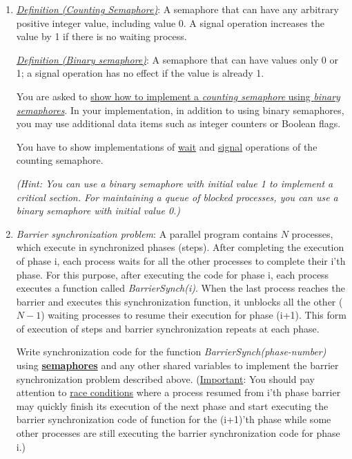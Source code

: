 \documentclass[11pt]{article}
\newcommand{\n}{\vspace{0.3cm}}
\begin{document}
\begin{enumerate}
  \item \textit{\ul{Definition (Counting Semaphore)}}: A semaphore that can have any arbitrary positive integer value, including value 0.  A signal operation increases the value by 1 if there is no waiting process.

    \textit{\ul{Definition (Binary semaphore)}}: A semaphore that can have values only 0 or 1; a signal operation has no effect if the value is already 1. \n

    You are asked to \ul{show how to implement a \textit{counting semaphore} using \textit{binary semaphores}}.  In your implementation, in addition to using binary semaphores, you may use additional data items such as integer counters or Boolean flags.

    You have to show implementations of \ul{wait} and \ul{signal} operations of the counting semaphore.

    \textit{(Hint: You can use a binary semaphore with initial value 1 to implement a critical section.  For maintaining a queue of blocked processes, you can use a binary semaphore with initial value 0.)}
    \newpage

  \item \textit{Barrier synchronization problem}: A parallel program contains \(N\) processes, which execute in synchronized phases (steps).  After completing the execution of phase i, each process waits for all the other processes to complete their i’th phase. For this purpose, after executing the code for phase i, each process executes a function called \textit{BarrierSynch(i)}.  When the last process reaches the barrier and executes this synchronization function, it unblocks all the other (\(N-1\)) waiting processes to resume their execution for phase (i+1). This form of execution of steps and barrier synchronization repeats at each phase.

    Write synchronization code for the function \textit{BarrierSynch(phase-number)} using \textbf{\ul{semaphores}} and any other shared variables to implement the barrier synchronization problem described above.  (\ul{Important}: You should pay attention to \ul{race conditions} where a process resumed from i’th phase barrier may quickly finish its execution of the next phase and start executing the barrier synchronization code of function for the (i+1)’th phase while some other processes are still executing the barrier synchronization code for phase i.)


\end{enumerate}
\end{document}
